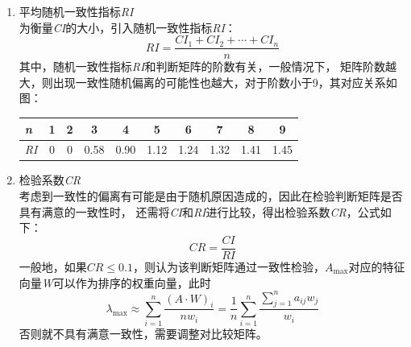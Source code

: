\documentclass[a4paper, 12pt]{article}
\numberwithin{equation}{section}
\begin{document}
\begin{enumerate}[(1)]
\begin{enumerate}
                                \item 平均随机一致性指标\textit{RI} \\
                                    为衡量\textit{CI}的大小，引入随机一致性指标\textit{RI}：
                                    \begin{equation}
                                        RI = \frac{CI_{1} + CI_{2} + \cdots + CI_{n}}{n}
                                    \end{equation}
                                    其中，随机一致性指标\textit{RI}和判断矩阵的阶数有关，一般情况下，
                                    矩阵阶数越大，则出现一致性随机偏离的可能性也越大，对于阶数小于9，其对应关系如图：
                                    \begin{table}[h]
                                        \centering
                                        \begin{tabular}{l|c c c c c c c c c} \hline
                                            \textit{n} & 1 & 2 & 3 & 4 & 5 & 6 & 7 & 8 & 9 \\ \hline
                                            \textit{RI} & 0 & 0 & 0.58 & 0.90 & 1.12 & 1.24 & 1.32 & 1.41 & 1.45 \\ \hline
                                        \end{tabular}
                                    \end{table}

                                \item 检验系数\textit{CR} \\
                                    考虑到一致性的偏离有可能是由于随机原因造成的，因此在检验判断矩阵是否具有满意的一致性时，
                                    还需将\textit{CI}和\textit{RI}进行比较，得出检验系数\textit{CR}，公式如下：
                                    \begin{equation}
                                        CR = \frac{CI}{RI}
                                    \end{equation}
                                    一般地，如果$ CR \le 0.1 $，则认为该判断矩阵通过一致性检验，$ A_{\max} $对应的特征向量\textit{W}可以作为排序的权重向量，此时
                                    \begin{equation}
                                        \lambda _{\max} \approx \sum_{i=1}^{n} \frac{ (A \cdot W)_{i}}{nw_{i}} = \frac{1}{n} \sum_{i=1}^{n} \frac{\sum_{j=1}^{n} a_{ij}w_{j}}{w_{i}}
                                    \end{equation}
                                    否则就不具有满意一致性，需要调整对比较矩阵。
                            \end{enumerate}
                    \end{enumerate}
\end{document}
